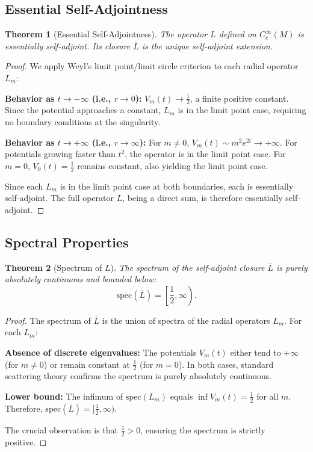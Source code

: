 \documentclass[12pt]{article}
\newtheorem{theorem}{Theorem}[section]
\begin{document}
\subsection{Essential Self-Adjointness}

\begin{theorem}[Essential Self-Adjointness]
The operator $L$ defined on $C_c^\infty(M)$ is essentially self-adjoint. Its closure $\overline{L}$ is the unique self-adjoint extension.
\end{theorem}

\begin{proof}
We apply Weyl's limit point/limit circle criterion to each radial operator $L_m$:

\textbf{Behavior as $t \to -\infty$ (i.e., $r \to 0$):} $V_m(t) \to \frac{1}{2}$, a finite positive constant. Since the potential approaches a constant, $L_m$ is in the limit point case, requiring no boundary conditions at the singularity.

\textbf{Behavior as $t \to +\infty$ (i.e., $r \to \infty$):} For $m \neq 0$, $V_m(t) \sim m^2 e^{2t} \to +\infty$. For potentials growing faster than $t^2$, the operator is in the limit point case. For $m = 0$, $V_0(t) = \frac{1}{2}$ remains constant, also yielding the limit point case.

Since each $L_m$ is in the limit point case at both boundaries, each is essentially self-adjoint. The full operator $L$, being a direct sum, is therefore essentially self-adjoint.
\end{proof}

\subsection{Spectral Properties}

\begin{theorem}[Spectrum of $L$]
The spectrum of the self-adjoint closure $\overline{L}$ is purely absolutely continuous and bounded below:
\begin{equation}
\text{spec}(\overline{L}) = \left[\frac{1}{2}, \infty\right).
\end{equation}
\end{theorem}

\begin{proof}
The spectrum of $\overline{L}$ is the union of spectra of the radial operators $L_m$. For each $L_m$:

\textbf{Absence of discrete eigenvalues:} The potentials $V_m(t)$ either tend to $+\infty$ (for $m \neq 0$) or remain constant at $\frac{1}{2}$ (for $m = 0$). In both cases, standard scattering theory confirms the spectrum is purely absolutely continuous.

\textbf{Lower bound:} The infimum of $\text{spec}(L_m)$ equals $\inf V_m(t) = \frac{1}{2}$ for all $m$. Therefore, $\text{spec}(\overline{L}) = [\frac{1}{2}, \infty)$.

The crucial observation is that $\frac{1}{2} > 0$, ensuring the spectrum is strictly positive.
\end{proof}
\end{document}
